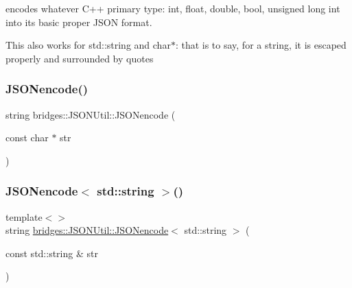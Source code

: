 encodes whatever C++ primary type\+: int, float, double, bool, unsigned long int into its basic proper J\+S\+ON format.

This also works for std\+::string and char$\ast$\+: that is to say, for a string, it is escaped properly and surrounded by quotes \mbox{\label{namespacebridges_1_1_j_s_o_n_util_a8167097b34730f71a1b395a76eecd550}} 
\subsubsection{\texorpdfstring{J\+S\+O\+Nencode()}{JSONencode()}\hspace{0.1cm}{\footnotesize\ttfamily [2/2]}}
{\footnotesize\ttfamily string bridges\+::\+J\+S\+O\+N\+Util\+::\+J\+S\+O\+Nencode (\begin{DoxyParamCaption}\item[{const char $\ast$}]{str }\end{DoxyParamCaption})\hspace{0.3cm}{\ttfamily [inline]}}

\mbox{\label{namespacebridges_1_1_j_s_o_n_util_a2b258507ccdf822ecebbbbb0b66fb06d}} 
\subsubsection{\texorpdfstring{J\+S\+O\+Nencode$<$ std\+::string $>$()}{JSONencode< std::string >()}}
{\footnotesize\ttfamily template$<$$>$ \\
string \mbox{\hyperlink{namespacebridges_1_1_j_s_o_n_util_aaf500e70dc1b2a9fd1284e386af1be63}{bridges\+::\+J\+S\+O\+N\+Util\+::\+J\+S\+O\+Nencode}}$<$ std\+::string $>$ (\begin{DoxyParamCaption}\item[{const std\+::string \&}]{str }\end{DoxyParamCaption})\hspace{0.3cm}{\ttfamily [inline]}}

